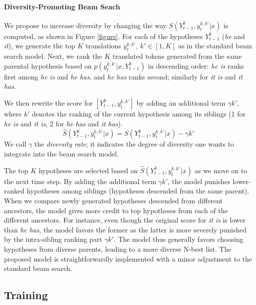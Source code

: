 \paragraph{Diversity-Promoting Beam Seach}
We propose to increase diversity by changing
the way $S(Y_{t-1}^k,y_t^{k,k'}|x)$ is computed,
as shown in Figure \ref{figure}.
For each of the  hypotheses $Y_{t-1}^k$ ({\it he} and {\it it}),
we generate the top $K$ translations
 $y_t^{k,k'}$, $k'\in [1,K]$ as in the standard beam search model.
Next, we  rank the $K$ translated tokens generated from the same parental hypothesis
based on $p(y_t^{k,k'}|x,Y_{t-1}^k)$ 
in descending order: {\it he is} ranks first among {\it he is} and {\it he has}, and {\it he has} ranks second;
similarly for {\it it is} and {\it it has}.
 
We then rewrite the score for $[Y_{t-1}^k, y_t^{k,k'}]$ by adding an additional term $\gamma k'$,
 where $k'$ denotes the ranking of the current hypothesis among its siblings (1 for {\it he is} and {\it it is}, 2 for {\it he has} and {\it it has}).
\begin{equation}
\hat{S}(Y_{t-1}^k,y_t^{k,k'}|x)=S(Y_{t-1}^k,y_t^{k,k'}|x)-\gamma k'
\label{dive}
\end{equation}
We call $\gamma$ the {\it diversity rate}; it indicates the degree of diversity one wants to integrate into the beam search model.

The top $K$ hypotheses are selected based on $\hat{S}(Y_{t-1}^k,y_t^{k,k'}|x)$ as we move on to the next time step.
By adding the additional term $\gamma k'$, 
the model punishes lower-ranked hypotheses among siblings (hypotheses descended from the same parent).
When we compare newly generated hypotheses descended from different ancestors, the model gives more credit to  top hypotheses from each of the different ancestors.
For instance, even though the original score for {\it it is} is lower than {\it he has},
the model favors the former as the latter is more severely punished by the intra-sibling ranking part $\gamma k'$. 
The model thus generally favors choosing hypotheses from diverse parents, leading to a more diverse N-best list. 
The proposed model is straightforwardly implemented with a minor adjustment to the standard beam search.

\subsection{Training}

